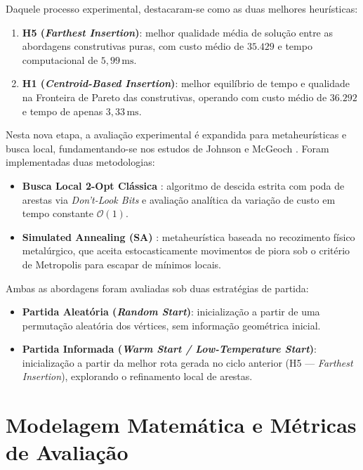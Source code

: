 \documentclass[12pt, a4paper]{article}
\begin{document}
Daquele processo experimental, destacaram-se como as duas melhores heurísticas:
\begin{enumerate}
    \item \textbf{H5 (\textit{Farthest Insertion})}: melhor qualidade média de solução entre as abordagens construtivas puras, com custo médio de $35.429$ e tempo computacional de $5{,}99\,\mathrm{ms}$.
    \item \textbf{H1 (\textit{Centroid-Based Insertion})}: melhor equilíbrio de tempo e qualidade na Fronteira de Pareto das construtivas, operando com custo médio de $36.292$ e tempo de apenas $3{,}33\,\mathrm{ms}$.
\end{enumerate}

Nesta nova etapa, a avaliação experimental é expandida para metaheurísticas e busca local, fundamentando-se nos estudos de Johnson e McGeoch \cite{johnson1997}. Foram implementadas duas metodologias:
\begin{itemize}
    \item \textbf{Busca Local 2-Opt Clássica} \cite{croes1958, lin1965}: algoritmo de descida estrita com poda de arestas via \textit{Don't-Look Bits} \cite{bentley1992} e avaliação analítica da variação de custo em tempo constante $\mathcal{O}(1)$.
    \item \textbf{Simulated Annealing (SA)} \cite{kirkpatrick1983, cerny1985}: metaheurística baseada no recozimento físico metalúrgico, que aceita estocasticamente movimentos de piora sob o critério de Metropolis para escapar de mínimos locais.
\end{itemize}

Ambas as abordagens foram avaliadas sob duas estratégias de partida:
\begin{itemize}
    \item \textbf{Partida Aleatória (\textit{Random Start})}: inicialização a partir de uma permutação aleatória dos vértices, sem informação geométrica inicial.
    \item \textbf{Partida Informada (\textit{Warm Start / Low-Temperature Start})}: inicialização a partir da melhor rota gerada no ciclo anterior (H5 --- \textit{Farthest Insertion}), explorando o refinamento local de arestas.
\end{itemize}

\section{Modelagem Matemática e Métricas de Avaliação}
\end{document}
